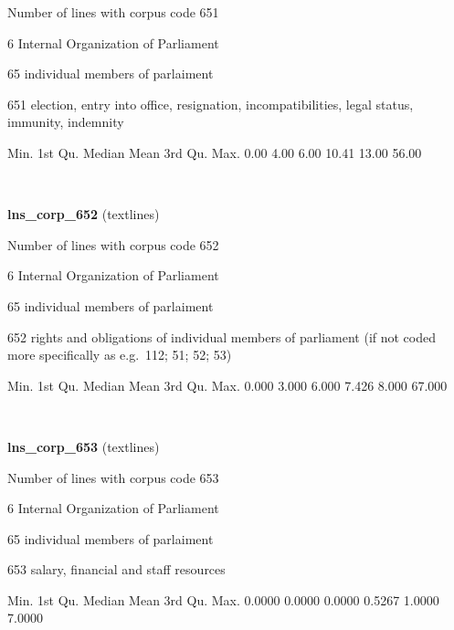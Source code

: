 \documentclass[]{article}
\newenvironment{Shaded}{\begin{snugshade}}{\end{snugshade}}
\newcommand{\FloatTok}[1]{\textcolor[rgb]{0.00,0.00,0.81}{{#1}}}
\newcommand{\NormalTok}[1]{{#1}}
\begin{document}
Number of lines with corpus code 651

6 Internal Organization of Parliament

65 individual members of parlaiment

651 election, entry into office, resignation, incompatibilities, legal
status, immunity, indemnity

\begin{Shaded}
\begin{Highlighting}[]
   \NormalTok{Min. 1st Qu.  Median    Mean 3rd Qu.    Max. }
   \FloatTok{0.00}    \FloatTok{4.00}    \FloatTok{6.00}   \FloatTok{10.41}   \FloatTok{13.00}   \FloatTok{56.00} 
\end{Highlighting}
\end{Shaded}

~

\vspace{1em}

\textbf{lns\_corp\_652} (textlines)

Number of lines with corpus code 652

6 Internal Organization of Parliament

65 individual members of parlaiment

652 rights and obligations of individual members of parliament (if not
coded more specifically as e.g.~112; 51; 52; 53)

\begin{Shaded}
\begin{Highlighting}[]
   \NormalTok{Min. 1st Qu.  Median    Mean 3rd Qu.    Max. }
  \FloatTok{0.000}   \FloatTok{3.000}   \FloatTok{6.000}   \FloatTok{7.426}   \FloatTok{8.000}  \FloatTok{67.000} 
\end{Highlighting}
\end{Shaded}

~

\vspace{1em}

\textbf{lns\_corp\_653} (textlines)

Number of lines with corpus code 653

6 Internal Organization of Parliament

65 individual members of parlaiment

653 salary, financial and staff resources

\begin{Shaded}
\begin{Highlighting}[]
   \NormalTok{Min. 1st Qu.  Median    Mean 3rd Qu.    Max. }
 \FloatTok{0.0000}  \FloatTok{0.0000}  \FloatTok{0.0000}  \FloatTok{0.5267}  \FloatTok{1.0000}  \FloatTok{7.0000} 
\end{Highlighting}
\end{Shaded}
\end{document}
